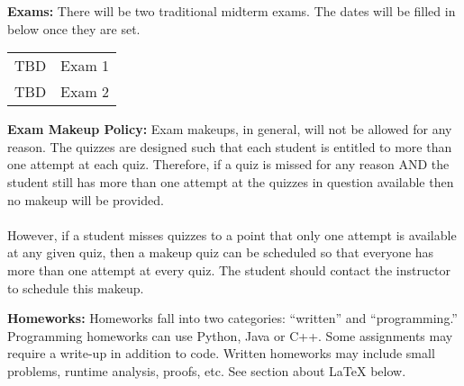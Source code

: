 \documentclass[12pt]{article}
\begin{document}
\textbf{Exams:}  There will be two traditional midterm exams. The dates will be filled in below once they are set.

\begin{tabular}{ll}
TBD	&	Exam 1 \\
TBD	&	Exam 2 \\
\end{tabular}

\textbf{Exam Makeup Policy:} Exam makeups, in general, will not be allowed for any reason. The quizzes are designed such that each student is entitled to more than one attempt at each quiz. Therefore, if a quiz is missed for any reason AND the student still has more than one attempt at the quizzes in question available then no makeup will be provided.\\
\\
However, if a student misses quizzes to a point that only one attempt is available at any given quiz, then a makeup quiz can be scheduled so that everyone has more than one attempt at every quiz. The student should contact the instructor to schedule this makeup. 

\textbf{Homeworks:} Homeworks fall into two categories:  ``written'' and ``programming.'' Programming homeworks can use Python, Java or C++. Some assignments may require a write-up in addition to code.  Written homeworks may include small problems, runtime analysis, proofs, etc.   See section about \LaTeX{} below.
\end{document}
